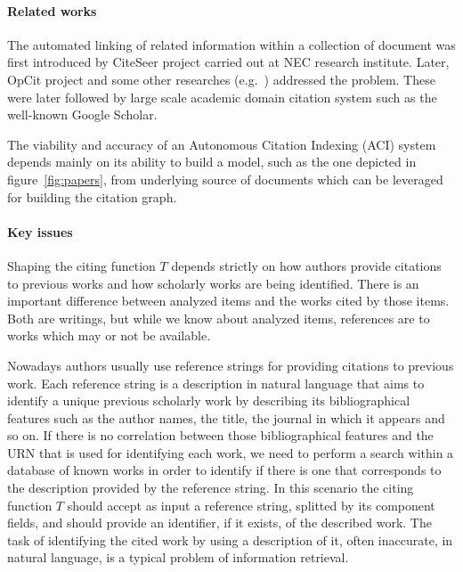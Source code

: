 \paragraph{Related works} The automated linking of related information within a collection of document was first introduced by CiteSeer project \cite{bollacker1998caw, giles1998cac, lawrence1999dla, lawrence1999iar} carried out at NEC research institute. Later, OpCit project \cite{bergmark2000aer, bergmark2001sad} and some other researches (e.g.\ \cite{claivaz2001fds}) addressed the problem. These were later followed by large scale academic domain citation system such as the well-known Google Scholar.

The viability and accuracy of an Autonomous Citation Indexing (ACI) system depends mainly on its ability to build a model, such as the one depicted in figure~\ref{fig:papers}, from underlying source of documents which can be leveraged for building the citation graph.

\paragraph{Key issues}\label{sec:citation_graph_urn} Shaping the citing function $T$ depends strictly on how authors provide citations to previous works and how scholarly works are being identified. There is an important difference between analyzed items and the works cited by those items. Both are writings, but while we know about analyzed items, references are to works which may or not be available.

Nowadays authors usually use reference strings for providing citations to previous work. Each reference string is a description in natural language that aims to identify a unique previous scholarly work by describing its bibliographical features such as the author names, the title, the journal in which it appears and so on. If there is no correlation between those bibliographical features and the URN that is used for identifying each work, we need to perform a search within a database of known works in order to identify if there is one that corresponds to the description provided by the reference string. In this scenario the citing function $T$ should accept as input a reference string, splitted by its component fields, and should provide an identifier, if it exists, of the described work. The task of identifying the cited work by using a description of it, often inaccurate, in natural language, is a typical problem of information retrieval.

